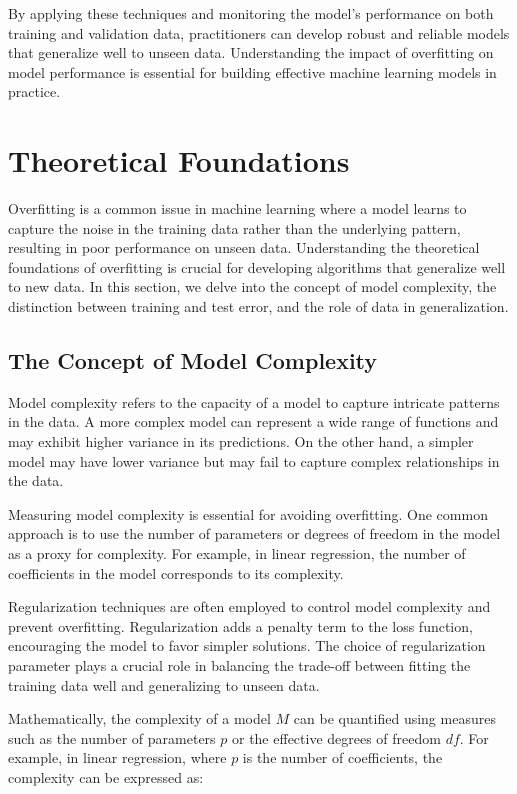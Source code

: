 \documentclass[12pt]{book} %
\begin{document}
By applying these techniques and monitoring the model's performance on both training and validation data, practitioners can develop robust and reliable models that generalize well to unseen data. Understanding the impact of overfitting on model performance is essential for building effective machine learning models in practice.

\section{Theoretical Foundations}

Overfitting is a common issue in machine learning where a model learns to capture the noise in the training data rather than the underlying pattern, resulting in poor performance on unseen data. Understanding the theoretical foundations of overfitting is crucial for developing algorithms that generalize well to new data. In this section, we delve into the concept of model complexity, the distinction between training and test error, and the role of data in generalization.

\subsection{The Concept of Model Complexity}

Model complexity refers to the capacity of a model to capture intricate patterns in the data. A more complex model can represent a wide range of functions and may exhibit higher variance in its predictions. On the other hand, a simpler model may have lower variance but may fail to capture complex relationships in the data.

Measuring model complexity is essential for avoiding overfitting. One common approach is to use the number of parameters or degrees of freedom in the model as a proxy for complexity. For example, in linear regression, the number of coefficients in the model corresponds to its complexity.

Regularization techniques are often employed to control model complexity and prevent overfitting. Regularization adds a penalty term to the loss function, encouraging the model to favor simpler solutions. The choice of regularization parameter plays a crucial role in balancing the trade-off between fitting the training data well and generalizing to unseen data.

Mathematically, the complexity of a model \(M\) can be quantified using measures such as the number of parameters \(p\) or the effective degrees of freedom \(df\). For example, in linear regression, where \(p\) is the number of coefficients, the complexity can be expressed as:
\end{document}
